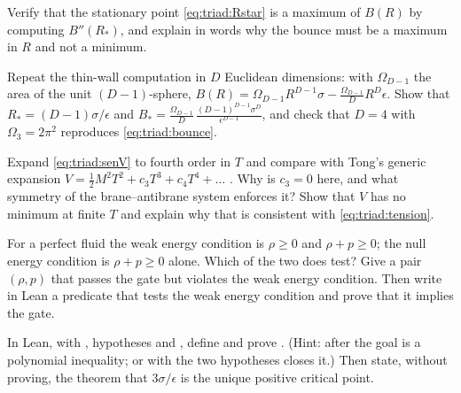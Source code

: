 \begin{exercise}[$\star$]
Verify that the stationary point \eqref{eq:triad:Rstar} is a maximum of $B(R)$ by computing
$B''(R_*)$, and explain in words why the bounce must be a maximum in $R$ and not a minimum.
\end{exercise}

\begin{exercise}[$\star\star$]
Repeat the thin-wall computation in $D$ Euclidean dimensions: with $\Omega_{D-1}$ the area of
the unit $(D-1)$-sphere, $B(R)=\Omega_{D-1}R^{D-1}\sigma-\frac{\Omega_{D-1}}{D}R^D\epsilon$.
Show that $R_*=(D-1)\sigma/\epsilon$ and $B_*=\frac{\Omega_{D-1}}{D}\,
\frac{(D-1)^{D-1}\sigma^D}{\epsilon^{D-1}}$, and check that $D=4$ with $\Omega_3=2\pi^2$
reproduces \eqref{eq:triad:bounce}.
\end{exercise}

\begin{exercise}[$\star\star$]
Expand \eqref{eq:triad:senV} to fourth order in $T$ and compare with Tong's generic expansion
$V=\tfrac12M^2T^2+c_3T^3+c_4T^4+\dots$ . Why is $c_3=0$
here, and what symmetry of the brane--antibrane system enforces it? Show that $V$ has no
minimum at finite $T$ and explain why that is consistent with \eqref{eq:triad:tension}.
\end{exercise}

\begin{exercise}[$\star\star$]
For a perfect fluid the weak energy condition is $\rho\ge0$ and $\rho+p\ge0$; the null energy
condition is $\rho+p\ge0$ alone. Which of the two does  test?
Give a pair $(\rho,p)$ that passes the gate but violates the weak energy condition. Then write
in Lean a predicate that tests the weak energy condition and prove that it implies the gate.
\end{exercise}

\begin{exercise}[$\star\star$]\label{exe:triad:leanbounce}
In Lean, with , hypotheses  and , define
and prove . (Hint: after  the goal is a polynomial
inequality;  or  with the two hypotheses closes it.) Then state,
without proving, the theorem that $3\sigma/\epsilon$ is the unique positive critical point.
\end{exercise}

